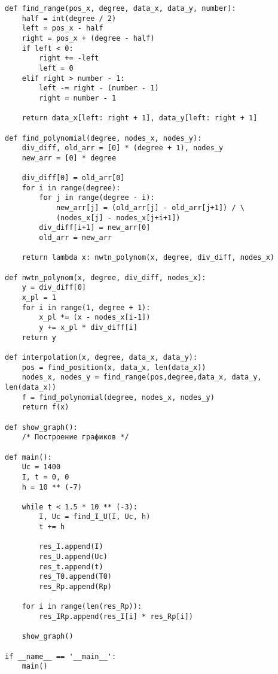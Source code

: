 \begin{lstlisting}[label=code1, caption = Лабораторная работа №2]
def find_range(pos_x, degree, data_x, data_y, number):
	half = int(degree / 2)
	left = pos_x - half
	right = pos_x + (degree - half)
	if left < 0:
		right += -left
		left = 0
	elif right > number - 1:
		left -= right - (number - 1)
		right = number - 1
	
	return data_x[left: right + 1], data_y[left: right + 1]

def find_polynomial(degree, nodes_x, nodes_y):
	div_diff, old_arr = [0] * (degree + 1), nodes_y
	new_arr = [0] * degree
	
	div_diff[0] = old_arr[0]
	for i in range(degree):
		for j in range(degree - i):
			new_arr[j] = (old_arr[j] - old_arr[j+1]) / \
			(nodes_x[j] - nodes_x[j+i+1])
		div_diff[i+1] = new_arr[0]
		old_arr = new_arr
	
	return lambda x: nwtn_polynom(x, degree, div_diff, nodes_x)

def nwtn_polynom(x, degree, div_diff, nodes_x):
	y = div_diff[0]
	x_pl = 1
	for i in range(1, degree + 1):
		x_pl *= (x - nodes_x[i-1])
		y += x_pl * div_diff[i]
	return y

def interpolation(x, degree, data_x, data_y):
	pos = find_position(x, data_x, len(data_x))
	nodes_x, nodes_y = find_range(pos,degree,data_x, data_y, len(data_x))
	f = find_polynomial(degree, nodes_x, nodes_y)
	return f(x)

def show_graph():
	/* Построение графиков */

def main():
	Uc = 1400
	I, t = 0, 0
	h = 10 ** (-7)
	
	while t < 1.5 * 10 ** (-3):
		I, Uc = find_I_U(I, Uc, h)
		t += h
		
		res_I.append(I)
		res_U.append(Uc)
		res_t.append(t)
		res_T0.append(T0)
		res_Rp.append(Rp)
	
	for i in range(len(res_Rp)):
		res_IRp.append(res_I[i] * res_Rp[i])
	
	show_graph()

if __name__ == '__main__':
	main()
\end{lstlisting}